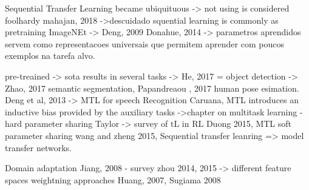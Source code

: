 \documentclass[sigconf]{acmart}
\begin{document}
  Sequential Transfer Learning became ubiquituous -> not using is considered foolhardy mahajan, 2018 ->descuidado
  squential learning is commonly as pretraining ImageNEt -> Deng, 2009
  Donahue, 2014 -> parametros aprendidos servem como representacoes universais que permitem aprender com poucos exemplos na tarefa alvo.

  pre-treained -> sota results in several tasks -> He, 2017 = object detection -> Zhao, 2017 semantic segmentation, Papandreaou , 2017 human pose esimation.
  Deng et al, 2013 -> MTL for speech Recognition
  Caruana, MTL introduces an inductive bias provided by the auxiliary tasks ->chapter on multitask learning - hard parameter sharing
  Taylor -> survey of tL in RL
  Duong 2015, MTL soft parameter sharing
  wang and zheng 2015, Sequential transfer leanring => model transfer
networks.


  Domain adaptation
  Jiang, 2008 - survey
  zhou 2014, 2015 -> different feature spaces 
  weightning approaches Huang, 2007, Sugiama 2008
      
\end{document}
